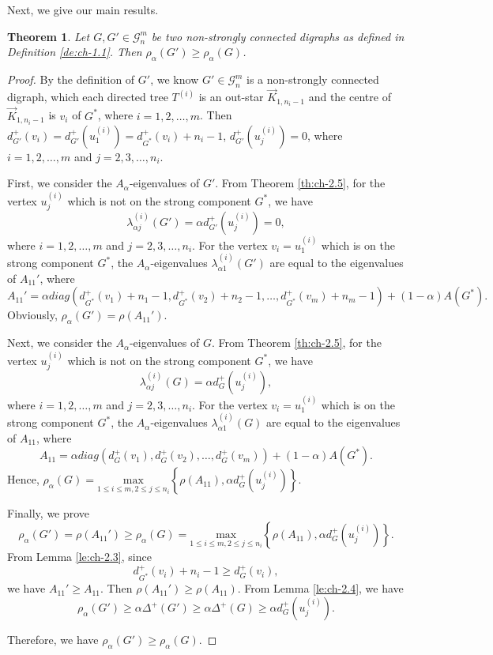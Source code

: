 \documentclass[11pt]{article}
\newtheorem{theorem}{Theorem}[section]
\begin{document}
Next, we give our main results.

\noindent\begin{theorem}\label{th:ch-2.7} Let $G,G'\in\mathcal{G}_n^m$ be two non-strongly connected digraphs as defined in Definition \ref{de:ch-1.1}. Then $\rho_\alpha(G')\geq\rho_\alpha(G)$.
\end{theorem}
\begin{proof}
By the definition of $G'$, we know $G'\in\mathcal{G}_n^m$ is a non-strongly connected digraph, which each directed tree $T^{(i)}$ is an out-star $\stackrel{\rightarrow}{K}_{1,n_i-1}$ and the centre of $\stackrel{\rightarrow}{K}_{1,n_i-1}$ is $v_i$ of $G^*$, where $i=1,2,\ldots,m$. Then $d_{G'}^+(v_i)=d_{G'}^+(u_1^{(i)})=d_{G^*}^+(v_i)+n_i-1$, $d_{G'}^+(u_j^{(i)})=0$, where $i=1,2,\ldots,m$ and $j=2,3,\ldots,n_i$.

First, we consider the $A_\alpha$-eigenvalues of $G'$. From Theorem \ref{th:ch-2.5}, for the vertex $u_j^{(i)}$ which is not on the strong component $G^*$, we have
$$\lambda_{\alpha j}^{(i)}(G')=\alpha d_{G'}^+(u_j^{(i)})=0,$$
where $i=1,2,\ldots,m$ and $j=2,3,\ldots,n_i$. For the vertex $v_i=u_1^{(i)}$ which is on the strong component $G^*$, the $A_\alpha$-eigenvalues $\lambda_{\alpha 1}^{(i)}(G')$ are equal to the eigenvalues of $A_{11}'$, where
$$A_{11}'=\alpha diag\left(d_{G^*}^+(v_1)+n_1-1,d_{G^*}^+(v_2)+n_2-1,\ldots,d_{G^*}^+(v_m)+n_m-1\right)+(1-\alpha)A(G^*).$$
Obviously, $\rho_\alpha(G')=\rho(A_{11}')$.

Next, we consider the $A_\alpha$-eigenvalues of $G$. From Theorem \ref{th:ch-2.5}, for the vertex $u_j^{(i)}$ which is not on the strong component $G^*$, we have
$$\lambda_{\alpha j}^{(i)}(G)=\alpha d_{G}^+(u_j^{(i)}),$$
where $i=1,2,\ldots,m$ and $j=2,3,\ldots,n_i$. For the vertex $v_i=u_1^{(i)}$ which is on the strong component $G^*$, the $A_\alpha$-eigenvalues $\lambda_{\alpha 1}^{(i)}(G)$ are equal to the eigenvalues of $A_{11}$, where
$$A_{11}=\alpha diag\left(d_{G}^+(v_1),d_{G}^+(v_2),\ldots,d_{G}^+(v_m)\right)+(1-\alpha)A(G^*).$$
Hence, $\rho_\alpha(G)=\underset{1\leq i\leq m,2\leq j\leq n_i}{\mathrm{max}}\left\{\rho(A_{11}), \alpha d_{G}^+(u_j^{(i)})\right\}$.

Finally, we prove
$$\rho_\alpha(G')=\rho(A_{11}')\geq\rho_\alpha(G)=\underset{1\leq i\leq m,2\leq j\leq n_i}{\mathrm{max}}\left\{\rho(A_{11}), \alpha d_{G}^+(u_j^{(i)})\right\}.$$
From Lemma \ref{le:ch-2.3}, since
$$d_{G^*}^+(v_i)+n_i-1\geq d_{G}^+(v_i),$$
we have $A_{11}'\geq A_{11}$. Then $\rho(A_{11}')\geq\rho(A_{11})$. From Lemma \ref{le:ch-2.4}, we have
$$\rho_\alpha(G')\geq\alpha \Delta^+(G') \geq \alpha \Delta^+(G) \geq \alpha d_{G}^+(u_j^{(i)}).$$

Therefore, we have $\rho_\alpha(G')\geq\rho_\alpha(G)$.
\end{proof}
\end{document}
